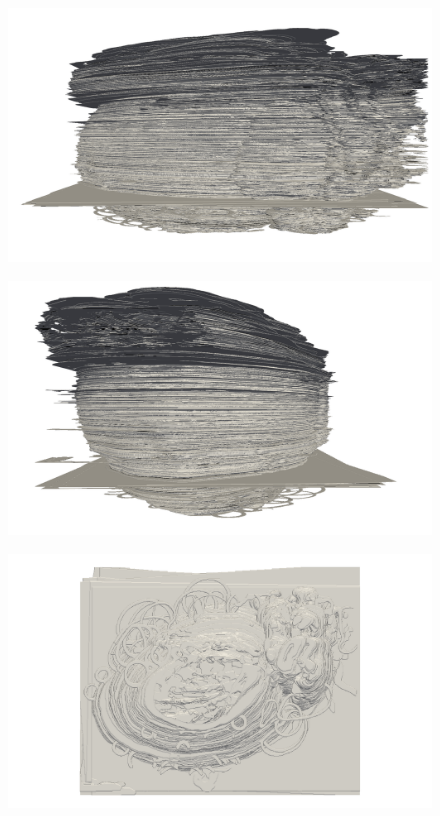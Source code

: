 	\begin{figure}
	  \centering
	  \includegraphics[width=0.9\textheight]{Ch7/Figs/Rat28/contours/whole_negative_x_affine}
	  \caption{}
	  \label{fig:image1.png}
	\end{figure}

	\begin{figure}
	  \centering
	  \includegraphics[width=0.9\textheight]{Ch7/Figs/Rat28/contours/whole_positive_y_affine}
	  \caption{}
	  \label{fig:image1.png}
	\end{figure}

	\begin{figure}
	  \centering
	  \includegraphics[width=0.9\textheight]{Ch7/Figs/Rat28/contours/whole_positive_z_affine}
	  \caption{}
	  \label{fig:image1.png}
	\end{figure}
	
